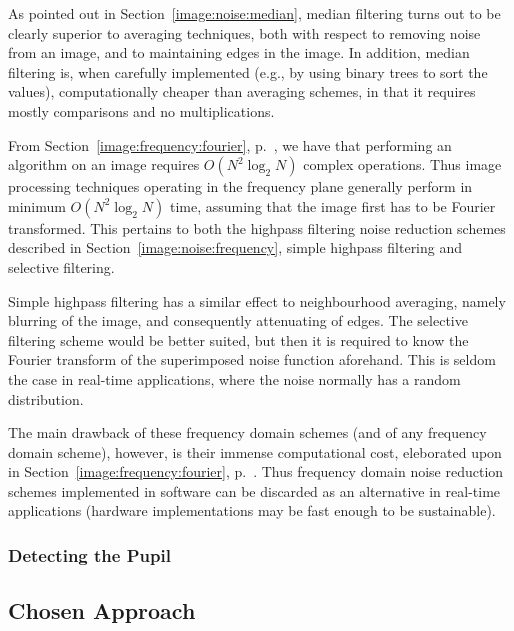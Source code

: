 As pointed out in Section~\ref{image:noise:median}, median filtering
turns out to be clearly superior to averaging techniques, both with
respect to removing noise from an image, and to maintaining edges in
the image.  In addition, median filtering is, when carefully
implemented (e.g., by using binary trees to sort the values),
computationally cheaper than averaging schemes, in that it requires
mostly comparisons and no multiplications.

From Section~\ref{image:frequency:fourier}, p.~\pageref{pg:fft:O}, we
have that performing an {\fft} algorithm on an image requires
$O(N^{2}\log_{2}N)$ complex operations.  Thus image processing
techniques operating in the frequency plane generally perform in
minimum $O(N^{2}\log_{2}N)$ time, assuming that the image first has to
be Fourier transformed.  This pertains to both the highpass filtering
noise reduction schemes described in
Section~\ref{image:noise:frequency}, simple highpass filtering and
selective filtering.

Simple highpass filtering has a similar effect to neighbourhood
averaging, namely blurring of the image, and consequently attenuating
of edges.  The selective filtering scheme would be better suited, but
then it is required to know the Fourier transform of the superimposed
noise function aforehand.  This is seldom the case in real-time
applications, where the noise normally has a random distribution.

The main drawback of these frequency domain schemes (and of any
frequency domain scheme), however, is their immense computational
cost, eleborated upon in Section~\ref{image:frequency:fourier},
p.~\pageref{pg:fft:O}.  Thus frequency domain noise reduction schemes
implemented in software can be discarded as an alternative in
real-time applications (hardware implementations may be fast enough
to be sustainable).

\subsubsection{Detecting the Pupil}

\subsection{Chosen Approach}
\label{image:concl:approach}

